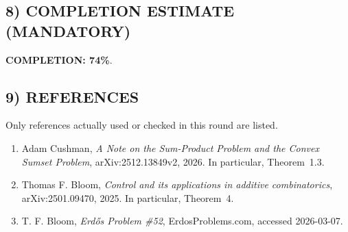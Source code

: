 \subsection{8) COMPLETION ESTIMATE (MANDATORY)}
\textbf{COMPLETION: 74\%}.

\subsection{9) REFERENCES}
Only references actually used or checked in this round are listed.
\begin{enumerate}
\item Adam Cushman, \emph{A Note on the Sum-Product Problem and the Convex Sumset Problem}, arXiv:2512.13849v2, 2026. In particular, Theorem~1.3.
\item Thomas F. Bloom, \emph{Control and its applications in additive combinatorics}, arXiv:2501.09470, 2025. In particular, Theorem~4.
\item T. F. Bloom, \emph{Erd\H{o}s Problem \#52}, ErdosProblems.com, accessed 2026-03-07.
\end{enumerate}

